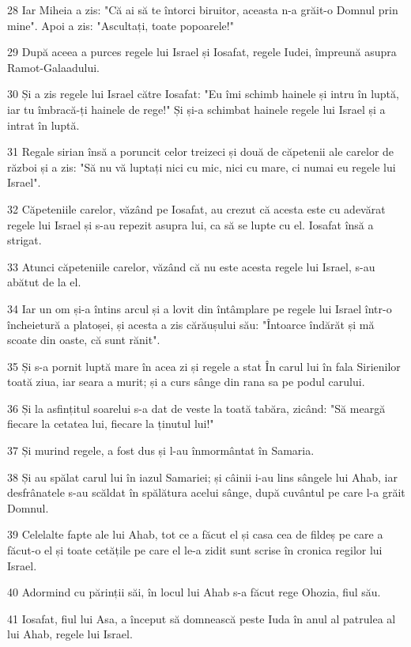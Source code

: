 \par 28 Iar Miheia a zis: "Că ai să te întorci biruitor, aceasta n-a grăit-o Domnul prin mine". Apoi a zis: "Ascultați, toate popoarele!"
\par 29 După aceea a purces regele lui Israel și Iosafat, regele Iudei, împreună asupra Ramot-Galaadului.
\par 30 Și a zis regele lui Israel către Iosafat: "Eu îmi schimb hainele și intru în luptă, iar tu îmbracă-ți hainele de rege!" Și și-a schimbat hainele regele lui Israel și a intrat în luptă.
\par 31 Regale sirian însă a poruncit celor treizeci și două de căpetenii ale carelor de război și a zis: "Să nu vă luptați nici cu mic, nici cu mare, ci numai eu regele lui Israel".
\par 32 Căpeteniile carelor, văzând pe Iosafat, au crezut că acesta este cu adevărat regele lui Israel și s-au repezit asupra lui, ca să se lupte cu el. Iosafat însă a strigat.
\par 33 Atunci căpeteniile carelor, văzând că nu este acesta regele lui Israel, s-au abătut de la el.
\par 34 Iar un om și-a întins arcul și a lovit din întâmplare pe regele lui Israel într-o încheietură a platoșei, și acesta a zis cărăușului său: "Întoarce îndărăt și mă scoate din oaste, că sunt rănit".
\par 35 Și s-a pornit luptă mare în acea zi și regele a stat În carul lui în fala Sirienilor toată ziua, iar seara a murit; și a curs sânge din rana sa pe podul carului.
\par 36 Și la asfințitul soarelui s-a dat de veste la toată tabăra, zicând: "Să meargă fiecare la cetatea lui, fiecare la ținutul lui!"
\par 37 Și murind regele, a fost dus și l-au înmormântat în Samaria.
\par 38 Și au spălat carul lui în iazul Samariei; și câinii i-au lins sângele lui Ahab, iar desfrânatele s-au scăldat în spălătura acelui sânge, după cuvântul pe care l-a grăit Domnul.
\par 39 Celelalte fapte ale lui Ahab, tot ce a făcut el și casa cea de fildeș pe care a făcut-o el și toate cetățile pe care el le-a zidit sunt scrise în cronica regilor lui Israel.
\par 40 Adormind cu părinții săi, în locul lui Ahab s-a făcut rege Ohozia, fiul său.
\par 41 Iosafat, fiul lui Asa, a început să domnească peste Iuda în anul al patrulea al lui Ahab, regele lui Israel.
